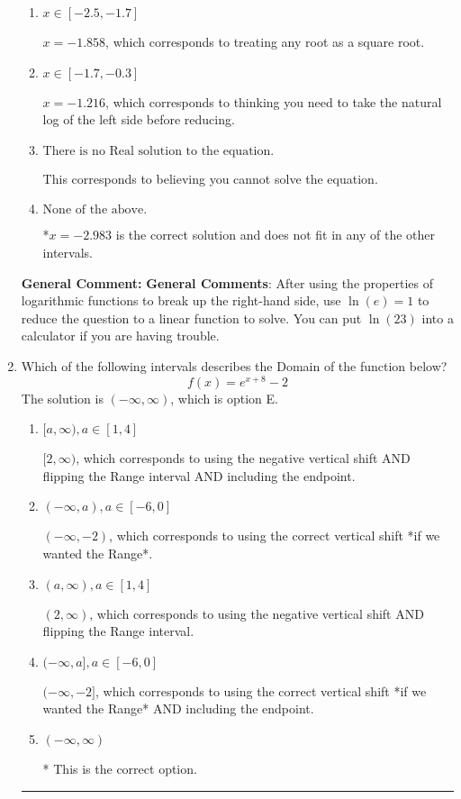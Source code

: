 \documentclass{extbook}[14pt]
\newcommand{\litem}[1]{\item #1

\rule{\textwidth}{0.4pt}}
\begin{document}
\begin{enumerate}
{\begin{enumerate}[label=\Alph*.]
$x = 2.983$, which is the negative of the correct solution.
\item \( x \in [-2.5, -1.7] \)

$x = -1.858$, which corresponds to treating any root as a square root.
\item \( x \in [-1.7, -0.3] \)

$x = -1.216$, which corresponds to thinking you need to take the natural log of the left side before reducing.
\item \( \text{There is no Real solution to the equation.} \)

This corresponds to believing you cannot solve the equation.
\item \( \text{None of the above.} \)

*$x = -2.983$ is the correct solution and does not fit in any of the other intervals.
\end{enumerate}

\textbf{General Comment:} \textbf{General Comments}: After using the properties of logarithmic functions to break up the right-hand side, use $\ln(e) = 1$ to reduce the question to a linear function to solve. You can put $\ln(23)$ into a calculator if you are having trouble.
}
\litem{
Which of the following intervals describes the Domain of the function below?
\[ f(x) = e^{x+8}-2 \]The solution is \( (-\infty, \infty) \), which is option E.\begin{enumerate}[label=\Alph*.]
\item \( [a, \infty), a \in [1, 4] \)

$[2, \infty)$, which corresponds to using the negative vertical shift AND flipping the Range interval AND including the endpoint.
\item \( (-\infty, a), a \in [-6, 0] \)

$(-\infty, -2)$, which corresponds to using the correct vertical shift *if we wanted the Range*.
\item \( (a, \infty), a \in [1, 4] \)

$(2, \infty)$, which corresponds to using the negative vertical shift AND flipping the Range interval.
\item \( (-\infty, a], a \in [-6, 0] \)

$(-\infty, -2]$, which corresponds to using the correct vertical shift *if we wanted the Range* AND including the endpoint.
\item \( (-\infty, \infty) \)

* This is the correct option.
\end{enumerate}

}
\end{enumerate}
\end{document}
